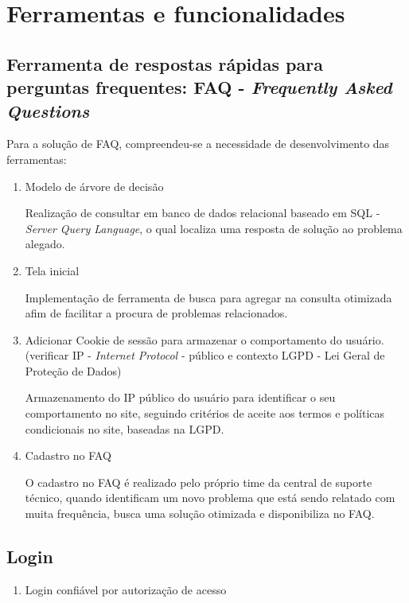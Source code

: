 \chapter{Ferramentas e funcionalidades}

\section{Ferramenta de respostas rápidas para perguntas frequentes: FAQ - \textit{Frequently Asked Questions}}

	Para a solução de FAQ, compreendeu-se a necessidade de desenvolvimento das ferramentas:
	
	\begin{enumerate}
		
		\item 
		Modelo de árvore de decisão
		
		Realização de consultar em banco de dados relacional baseado em SQL - \textit{Server Query Language}, o qual localiza uma resposta de solução ao problema alegado.
		
		\item 
		Tela inicial
		
		Implementação de ferramenta de busca para agregar na consulta otimizada afim de facilitar a procura de problemas relacionados.
		
		\item 
		Adicionar Cookie de sessão para armazenar o comportamento do usuário. (verificar IP - \textit{Internet Protocol} - público e contexto LGPD - Lei Geral de Proteção de Dados)
		
		Armazenamento do IP público do usuário para identificar o seu comportamento no site, seguindo critérios de aceite aos termos e políticas condicionais no site, baseadas na LGPD.
		
		\item 
		Cadastro no FAQ
		
		O cadastro no FAQ é realizado pelo próprio time da central de suporte técnico, quando identificam um novo problema que está sendo relatado com muita frequência, busca uma solução otimizada e disponibiliza no FAQ. 
		
	\end{enumerate}

\section{Login}

	\begin{enumerate}
		
		\item 
		Login confiável por autorização de acesso
		
	\end{enumerate}

